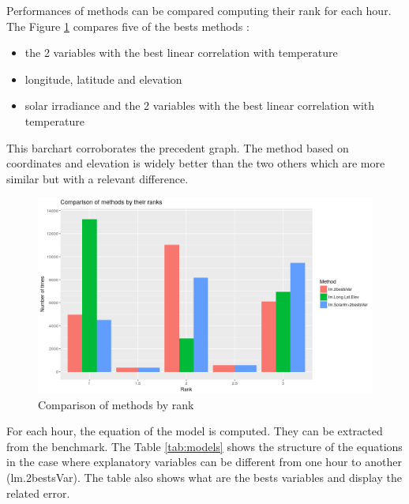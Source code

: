 \documentclass[12pt,twoside]{reedthesis}
\providecommand{\tightlist}{%
  \setlength{\itemsep}{0pt}\setlength{\parskip}{0pt}}
\theoremstyle{definition}
\theoremstyle{definition}
\theoremstyle{definition}
\theoremstyle{remark}
\begin{document}
Performances of methods can be compared computing their rank for each
hour. The Figure \ref{fig:barchart} compares five of the bests methods :
\begin{itemize}
\tightlist
\item
  the 2 variables with the best linear correlation with temperature
\item
  longitude, latitude and elevation
\item
  solar irradiance and the 2 variables with the best linear correlation
  with temperature
\end{itemize}
This barchart corroborates the precedent graph. The method based on
coordinates and elevation is widely better than the two others which are
more similar but with a relevant difference.
\begin{figure}

{\centering \includegraphics[width=1\linewidth]{figure/barchart} 

}

\caption{Comparison of methods by rank}\label{fig:barchart}
\end{figure}
For each hour, the equation of the model is computed. They can be
extracted from the benchmark. The Table \ref{tab:models} shows the
structure of the equations in the case where explanatory variables can
be different from one hour to another (lm.2bestsVar). The table also
shows what are the bests variables and display the related error.
\end{document}
